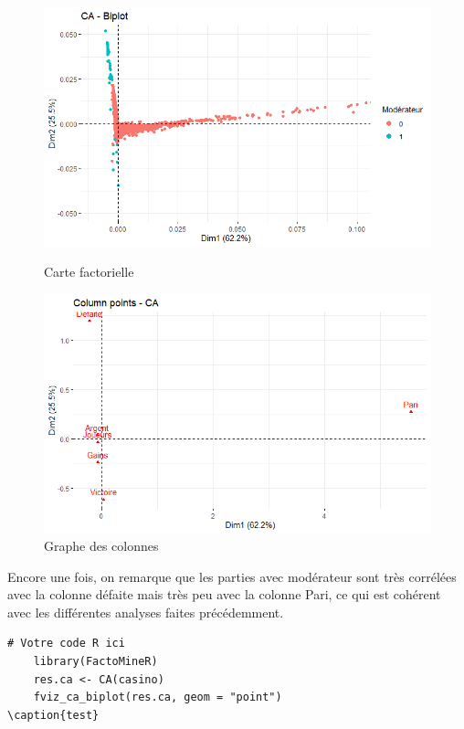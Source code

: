 \documentclass[a4paper, 12pt]{article}
\theoremstyle{exo}
\begin{document}
\begin{figure}[H]
\centering
    \begin{minipage}{0.49\textwidth}
        \centering
        \includegraphics[width=\textwidth]{figures/biplot.png}
        \caption{Carte factorielle}
    \end{minipage}
    \begin{minipage}{0.49\textwidth}
        \centering
        \includegraphics[width=\textwidth]{figures/afc_point.png}
        \caption{Graphe des colonnes}
    \end{minipage}
\end{figure}

Encore une fois, on remarque que les parties avec modérateur sont très corrélées avec la colonne défaite mais très peu avec la colonne Pari, ce qui est cohérent avec les différentes analyses faites précédemment.

\begin{lstlisting}[label={lst:afccode}]
    # Votre code R ici
    library(FactoMineR)
    res.ca <- CA(casino)
    fviz_ca_biplot(res.ca, geom = "point")
\caption{test}
\end{lstlisting}
\end{document}
